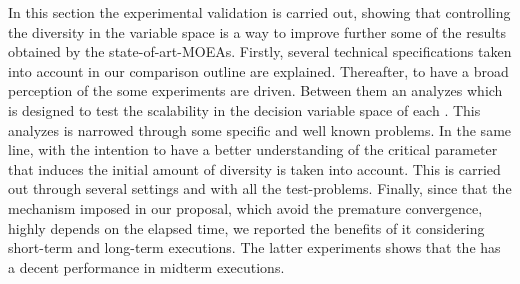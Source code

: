 In this section the experimental validation is carried out, showing that controlling the diversity in the variable space is a way to improve further some of the results obtained by the state-of-art-MOEAs.
%
Firstly, several technical specifications taken into account in our comparison outline are explained.
%
Thereafter, to have a broad perception of the \VSDMOEA{} some experiments are driven.
%
Between them an analyzes which is designed to test the scalability in the decision variable space of each \MOEA{}.
%
This analyzes is narrowed through some specific and well known problems.
%
In the same line, with the intention to have a better understanding of the critical parameter that induces the initial amount of diversity is taken into account.
%
This is carried out through several settings and with all the test-problems.
%
Finally, since that the mechanism imposed in our proposal, which avoid the premature convergence, highly depends on the elapsed time, we reported the benefits of it considering short-term and long-term executions.
%
The latter experiments shows that the \VSDMOEA{} has a decent performance in midterm executions.
%

